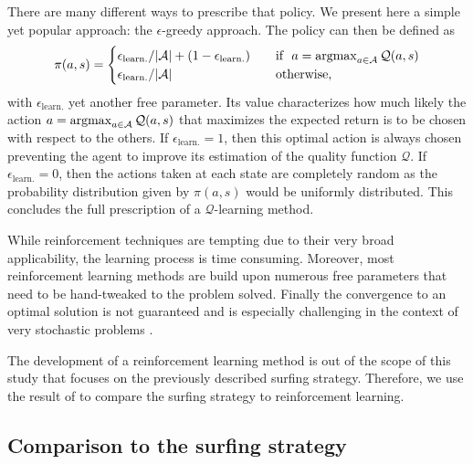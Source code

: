 There are many different ways to prescribe that policy. We present here a simple yet popular approach: the $\epsilon$-greedy approach.
The policy can then be defined as
\begin{equation}\label{eq:epsilon_greedy}
	\pi(a, s) = \begin{cases}
		\epsilon_{\mathrm{learn.}}/\lvert\mathcal{A}\rvert + (1 - \epsilon_{\mathrm{learn.}}) & \quad \text{if}~~a = \operatorname{argmax}_{a \in \mathcal{A}} \mathcal{Q}(a, s)\\
		\epsilon_{\mathrm{learn.}}/\lvert\mathcal{A}\rvert & \quad \text{otherwise},
	\end{cases}
\end{equation}
with $\epsilon_{\mathrm{learn.}}$ yet another free parameter.
Its value characterizes how much likely the action $a = \operatorname{argmax}_{a \in \mathcal{A}} \mathcal{Q}(a, s)$ that maximizes the expected return is to be chosen with respect to the others.
If $\epsilon_{\mathrm{learn.}} = 1$, then this optimal action is always chosen preventing the agent to improve its estimation of the quality function $\mathcal{Q}$.
If $\epsilon_{\mathrm{learn.}} = 0$, then the actions taken at each state are completely random as the probability distribution given by $\pi(a, s)$ would be uniformly distributed.
This concludes the full prescription of a $\mathcal{Q}$-learning method.

While reinforcement techniques are tempting due to their very broad applicability, the learning process is time consuming.
Moreover, most reinforcement learning methods are build upon numerous free parameters that need to be hand-tweaked to the problem solved.
Finally the convergence to an optimal solution is not guaranteed and is especially challenging in the context of very stochastic problems \citep{alageshan2020machine}.

The development of a reinforcement learning method is out of the scope of this study that focuses on the previously described surfing strategy.
Therefore, we use the result of \citep{alageshan2020machine} to compare the surfing strategy to reinforcement learning.

\subsection{Comparison to the surfing strategy}\label{sec:comparison_reinforcement_learning}

